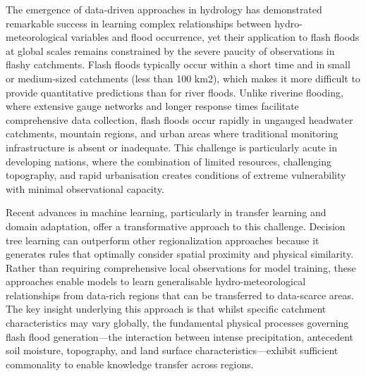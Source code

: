 The emergence of data-driven approaches in hydrology has demonstrated remarkable success in learning complex relationships between hydro-meteorological variables and flood occurrence, yet their application to flash floods at global scales remains constrained by the severe paucity of observations in flashy catchments. Flash floods typically occur within a short time and in small or medium-sized catchments (less than 100 km2), which makes it more difficult to provide quantitative predictions than for river floods. Unlike riverine flooding, where extensive gauge networks and longer response times facilitate comprehensive data collection, flash floods occur rapidly in ungauged headwater catchments, mountain regions, and urban areas where traditional monitoring infrastructure is absent or inadequate. This challenge is particularly acute in developing nations, where the combination of limited resources, challenging topography, and rapid urbanisation creates conditions of extreme vulnerability with minimal observational capacity.

Recent advances in machine learning, particularly in transfer learning and domain adaptation, offer a transformative approach to this challenge. Decision tree learning can outperform other regionalization approaches because it generates rules that optimally consider spatial proximity and physical similarity. Rather than requiring comprehensive local observations for model training, these approaches enable models to learn generalisable hydro-meteorological relationships from data-rich regions that can be transferred to data-scarce areas. The key insight underlying this approach is that whilst specific catchment characteristics may vary globally, the fundamental physical processes governing flash flood generation—the interaction between intense precipitation, antecedent soil moisture, topography, and land surface characteristics—exhibit sufficient commonality to enable knowledge transfer across regions.

